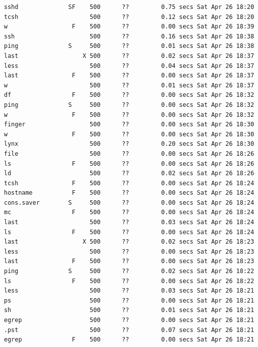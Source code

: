 \vspace{1em}

\begin{lstlisting}[style=terminal]
sshd              SF    500      ??         0.75 secs Sat Apr 26 18:20
tcsh                    500      ??         0.12 secs Sat Apr 26 18:20
w                  F    500      ??         0.00 secs Sat Apr 26 18:39
ssh                     500      ??         0.16 secs Sat Apr 26 18:38
ping              S     500      ??         0.01 secs Sat Apr 26 18:38
last                  X 500      ??         0.02 secs Sat Apr 26 18:37
less                    500      ??         0.04 secs Sat Apr 26 18:37
last               F    500      ??         0.00 secs Sat Apr 26 18:37
w                       500      ??         0.01 secs Sat Apr 26 18:37
df                 F    500      ??         0.00 secs Sat Apr 26 18:32
ping              S     500      ??         0.00 secs Sat Apr 26 18:32
w                  F    500      ??         0.00 secs Sat Apr 26 18:32
finger                  500      ??         0.00 secs Sat Apr 26 18:30
w                  F    500      ??         0.00 secs Sat Apr 26 18:30
lynx                    500      ??         0.20 secs Sat Apr 26 18:30
file                    500      ??         0.00 secs Sat Apr 26 18:26
ls                 F    500      ??         0.00 secs Sat Apr 26 18:26
ld                      500      ??         0.02 secs Sat Apr 26 18:26
tcsh               F    500      ??         0.00 secs Sat Apr 26 18:24
hostname           F    500      ??         0.00 secs Sat Apr 26 18:24
cons.saver        S     500      ??         0.00 secs Sat Apr 26 18:24
mc                 F    500      ??         0.00 secs Sat Apr 26 18:24
last                    500      ??         0.03 secs Sat Apr 26 18:24
ls                 F    500      ??         0.00 secs Sat Apr 26 18:24
last                  X 500      ??         0.02 secs Sat Apr 26 18:23
less                    500      ??         0.00 secs Sat Apr 26 18:23
last               F    500      ??         0.00 secs Sat Apr 26 18:23
ping              S     500      ??         0.02 secs Sat Apr 26 18:22
ls                 F    500      ??         0.00 secs Sat Apr 26 18:22
less                    500      ??         0.03 secs Sat Apr 26 18:21
ps                      500      ??         0.00 secs Sat Apr 26 18:21
sh                      500      ??         0.01 secs Sat Apr 26 18:21
egrep                   500      ??         0.00 secs Sat Apr 26 18:21
.pst                    500      ??         0.07 secs Sat Apr 26 18:21
egrep              F    500      ??         0.00 secs Sat Apr 26 18:21

\end{lstlisting}
